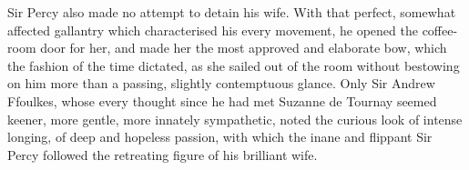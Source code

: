 Sir Percy also made no attempt to detain his wife. With that perfect, somewhat affected gallantry which characterised his every movement, he opened the coffee-room door for her, and made her the most approved and elaborate bow, which the fashion of the time dictated, as she sailed out of the room without bestowing on him more than a passing, slightly contemptuous glance. Only Sir Andrew Ffoulkes, whose every thought since he had met Suzanne de Tournay seemed keener, more gentle, more innately sympathetic, noted the curious look of intense longing, of deep and hopeless passion, with which the inane and flippant Sir Percy followed the retreating figure of his brilliant wife.